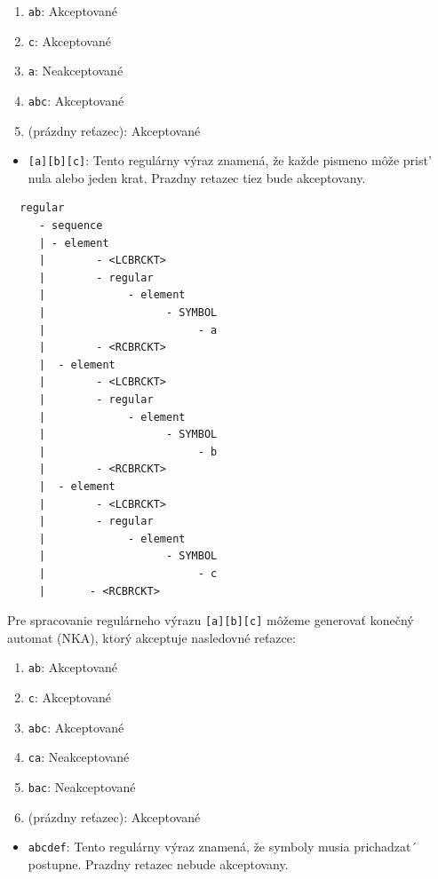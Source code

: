 \documentclass[a4paper,12pt]{article}
\begin{document}
\begin{enumerate}
    \item \texttt{ab}: Akceptované
    \item \texttt{c}: Akceptované
    \item \texttt{a}: Neakceptované
    \item \texttt{abc}: Akceptované
    \item \texttt{} (prázdny reťazec): Akceptované
\end{enumerate}

\newpage
\begin{itemize}
    \item \texttt{[a][b][c]}: Tento regulárny výraz znamená, že každe pismeno môže prist' nula alebo jeden krat. Prazdny retazec tiez bude akceptovany.
\end{itemize}

\begin{verbatim}
  regular
     - sequence
     | - element
     |        - <LCBRCKT>
     |        - regular
     |             - element
     |                   - SYMBOL
     |                        - a
     |        - <RCBRCKT>
     |  - element
     |        - <LCBRCKT>
     |        - regular
     |             - element
     |                   - SYMBOL
     |                        - b
     |        - <RCBRCKT>
     |	- element
     |        - <LCBRCKT>
     |        - regular
     |             - element
     |                   - SYMBOL
     |                        - c
     |       - <RCBRCKT>
    \end{verbatim}

Pre spracovanie regulárneho výrazu \texttt{[a][b][c]} môžeme generovať konečný automat (NKA), ktorý akceptuje nasledovné reťazce:

\begin{enumerate}
    \item \texttt{ab}: Akceptované
    \item \texttt{c}: Akceptované
    \item \texttt{abc}: Akceptované
    \item \texttt{ca}: Neakceptované
   \item \texttt{bac}: Neakceptované
    \item \texttt{} (prázdny reťazec): Akceptované
\end{enumerate}




\newpage
\begin{itemize}
    \item \texttt{abcdef}: Tento regulárny výraz znamená, že symboly musia prichadzat´ postupne. Prazdny retazec nebude akceptovany.
\end{itemize}
\end{document}
